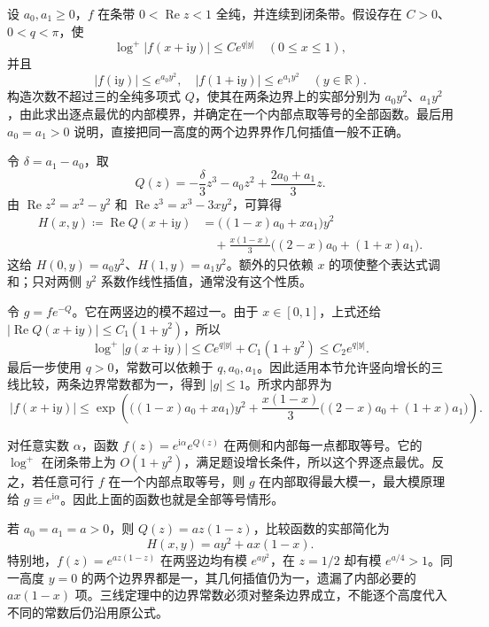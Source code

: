 \begin{exercise}[高斯边界权的三线比较]\label{b3:ex:19-draft-08}
设 \(a_0,a_1\ge0\)，\(f\) 在条带 \(0<\operatorname{Re}z<1\) 全纯，并连续到闭条带。假设存在 \(C>0\)、\(0<q<\pi\)，使
\[
 \log^+|f(x+\mathrm iy)|\le Ce^{q|y|}\quad(0\le x\le1),
\]
并且
\[
 |f(\mathrm iy)|\le e^{a_0y^2},\quad
 |f(1+\mathrm iy)|\le e^{a_1y^2}\quad(y\in\mathbb R).
\]
构造次数不超过三的全纯多项式 \(Q\)，使其在两条边界上的实部分别为 \(a_0y^2\)、\(a_1y^2\)，由此求出逐点最优的内部模界，并确定在一个内部点取等号的全部函数。最后用 \(a_0=a_1>0\) 说明，直接把同一高度的两个边界界作几何插值一般不正确。
\end{exercise}
\begin{solution}
令 \(\delta=a_1-a_0\)，取
\[
 Q(z)=-\frac\delta3z^3-a_0z^2+\frac{2a_0+a_1}{3}z.
\]
由 \(\operatorname{Re}z^2=x^2-y^2\) 和 \(\operatorname{Re}z^3=x^3-3xy^2\)，可算得
\[
 \begin{aligned}
 H(x,y)\coloneqq\operatorname{Re}Q(x+\mathrm iy)
 &=\bigl((1-x)a_0+xa_1\bigr)y^2\\
 &\quad+\frac{x(1-x)}3\bigl((2-x)a_0+(1+x)a_1\bigr).
 \end{aligned}
\]
这给 \(H(0,y)=a_0y^2\)、\(H(1,y)=a_1y^2\)。额外的只依赖 \(x\) 的项使整个表达式调和；只对两侧 \(y^2\) 系数作线性插值，通常没有这个性质。

令 \(g=f e^{-Q}\)。它在两竖边的模不超过一。由于 \(x\in[0,1]\)，上式还给 \(|\operatorname{Re}Q(x+\mathrm iy)|\le C_1(1+y^2)\)，所以
\[
 \log^+|g(x+\mathrm iy)|
 \le Ce^{q|y|}+C_1(1+y^2)
 \le C_2e^{q|y|}.
\]
最后一步使用 \(q>0\)，常数可以依赖于 \(q,a_0,a_1\)。因此适用本节允许竖向增长的三线比较，两条边界常数都为一，得到 \(|g|\le1\)。所求内部界为
\[
 \boxed{\ |f(x+\mathrm iy)|\le
 \exp\left(\bigl((1-x)a_0+xa_1\bigr)y^2
 +\frac{x(1-x)}3\bigl((2-x)a_0+(1+x)a_1\bigr)\right).\ }
\]

对任意实数 \(\alpha\)，函数 \(f(z)=e^{\mathrm i\alpha}e^{Q(z)}\) 在两侧和内部每一点都取等号。它的 \(\log^+\) 在闭条带上为 \(O(1+y^2)\)，满足题设增长条件，所以这个界逐点最优。反之，若任意可行 \(f\) 在一个内部点取等号，则 \(g\) 在内部取得最大模一，最大模原理给 \(g\equiv e^{\mathrm i\alpha}\)。因此上面的函数也就是全部等号情形。

若 \(a_0=a_1=a>0\)，则 \(Q(z)=az(1-z)\)，比较函数的实部简化为
\[
 H(x,y)=ay^2+ax(1-x).
\]
特别地，\(f(z)=e^{az(1-z)}\) 在两竖边均有模 \(e^{ay^2}\)，在 \(z=1/2\) 却有模 \(e^{a/4}>1\)。同一高度 \(y=0\) 的两个边界界都是一，其几何插值仍为一，遗漏了内部必要的 \(ax(1-x)\) 项。三线定理中的边界常数必须对整条边界成立，不能逐个高度代入不同的常数后仍沿用原公式。
\end{solution}

